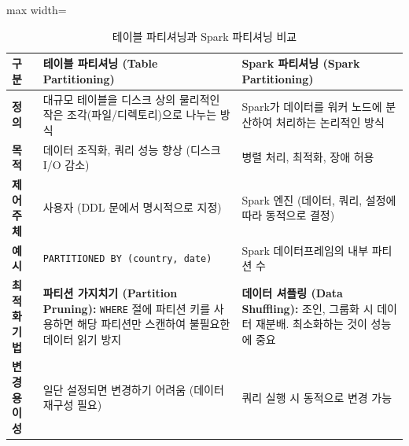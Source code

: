 \documentclass[11pt,a4paper]{article}
\theoremstyle{definition}
\begin{document}
\begin{table}[h!]
\centering
\caption{테이블 파티셔닝과 Spark 파티셔닝 비교}
\label{tab:partitioning_comparison}
\begin{adjustbox}{max width=\textwidth}
\begin{tabular}{p{}p{}p{}}
\toprule
\textbf{구분} & \textbf{테이블 파티셔닝 (Table Partitioning)} & \textbf{Spark 파티셔닝 (Spark Partitioning)} \\
\midrule
\textbf{정의} & 대규모 테이블을 디스크 상의 물리적인 작은 조각(파일/디렉토리)으로 나누는 방식 & Spark가 데이터를 워커 노드에 분산하여 처리하는 논리적인 방식 \\
\textbf{목적} & 데이터 조직화, 쿼리 성능 향상 (디스크 I/O 감소) & 병렬 처리, 최적화, 장애 허용 \\
\textbf{제어 주체} & 사용자 (DDL 문에서 명시적으로 지정) & Spark 엔진 (데이터, 쿼리, 설정에 따라 동적으로 결정) \\
\textbf{예시} & \texttt{PARTITIONED BY (country, date)} & Spark 데이터프레임의 내부 파티션 수 \\
\textbf{최적화 기법} & \textbf{파티션 가지치기 (Partition Pruning):} \texttt{WHERE} 절에 파티션 키를 사용하면 해당 파티션만 스캔하여 불필요한 데이터 읽기 방지 & \textbf{데이터 셔플링 (Data Shuffling):} 조인, 그룹화 시 데이터 재분배. 최소화하는 것이 성능에 중요 \\
\textbf{변경 용이성} & 일단 설정되면 변경하기 어려움 (데이터 재구성 필요) & 쿼리 실행 시 동적으로 변경 가능 \\
\bottomrule
\end{tabular}
\end{adjustbox}
\end{table}
\end{document}
